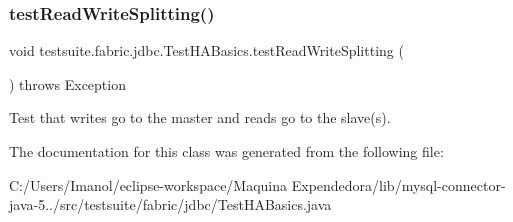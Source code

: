 \subsubsection{\texorpdfstring{test\+Read\+Write\+Splitting()}{testReadWriteSplitting()}}
{\footnotesize\ttfamily void testsuite.\+fabric.\+jdbc.\+Test\+H\+A\+Basics.\+test\+Read\+Write\+Splitting (\begin{DoxyParamCaption}{ }\end{DoxyParamCaption}) throws Exception}

Test that writes go to the master and reads go to the slave(s). 

The documentation for this class was generated from the following file\+:\begin{DoxyCompactItemize}
\item 
C\+:/\+Users/\+Imanol/eclipse-\/workspace/\+Maquina Expendedora/lib/mysql-\/connector-\/java-\/5../src/testsuite/fabric/jdbc/Test\+H\+A\+Basics.\+java\end{DoxyCompactItemize}
